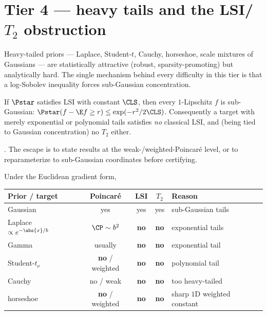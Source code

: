 \documentclass[../main.tex]{subfiles}
\begin{document}
\section{Tier 4 --- heavy tails and the LSI/\texorpdfstring{$T_2$}{T2} obstruction}
\label{sec:tier4}

Heavy-tailed priors --- Laplace, Student-$t$, Cauchy, horseshoe, scale mixtures of
Gaussians --- are statistically attractive (robust, sparsity-promoting) but analytically
hard. The single mechanism behind every difficulty in this tier is that a log-Sobolev
inequality forces sub-Gaussian concentration.

\begin{theorem}
\label{thm:heavy-tail-no-lsi}
If $\Pstar$ satisfies LSI with constant $\CLS$, then every $1$-Lipschitz $f$ is sub-Gaussian:
$\Pstar(f-\E f\ge r)\le\exp(-r^2/2\CLS)$. Consequently a target with merely exponential or
polynomial tails satisfies \emph{no} classical LSI, and (being tied to Gaussian
concentration) no $T_2$ either.
\end{theorem}
\noindent\cite{BobkovGotze1999,OttoVillani2000}. The escape is to state results at the
weak-/weighted-Poincar\'e level, or to reparameterize to sub-Gaussian coordinates before
certifying.

\begin{family}
\label{fam:heavy-tail-classification}
Under the Euclidean gradient form,
\begin{center}
\begin{tabularx}{\textwidth}{@{}p{} c c c Y@{}}
\toprule
Prior / target & Poincar\'e & LSI & $T_2$ & Reason\\
\midrule
Gaussian                 & yes & yes & yes & sub-Gaussian tails\\
Laplace $\propto e^{-\abs{x}/b}$ & $\CP\sim b^2$ & \textbf{no} & \textbf{no} & exponential tails\\
Gamma                    & usually & \textbf{no} & \textbf{no} & exponential tail\\
Student-$t_\nu$          & \textbf{no} / weighted & \textbf{no} & \textbf{no} & polynomial tail\\
Cauchy                   & no / weak & \textbf{no} & \textbf{no} & too heavy-tailed\\
horseshoe                & \textbf{no} / weighted & \textbf{no} & \textbf{no} & sharp $1$D weighted constant\\
\bottomrule
\end{tabularx}
\end{center}
\end{family}
\end{document}

